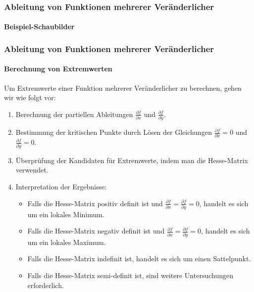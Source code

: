 \documentclass{beamer}
\begin{document}
  \begin{frame}
    \frametitle{Ableitung von Funktionen mehrerer Veränderlicher}
    \framesubtitle{Beispiel-Schaubilder}
  
    \begin{center}
    \end{center}
  \end{frame}

  \begin{frame}
    \frametitle{Ableitung von Funktionen mehrerer Veränderlicher}
    \framesubtitle{Berechnung von Extremwerten}
  
    Um Extremwerte einer Funktion mehrerer Veränderlicher zu berechnen, gehen wir wie folgt vor:
   
    \begin{enumerate}
      \item Berechnung der partiellen Ableitungen $\frac{\partial f}{\partial x}$ und $\frac{\partial f}{\partial y}$.
      \item Bestimmung der kritischen Punkte durch Lösen der Gleichungen $\frac{\partial f}{\partial x} = 0$ und $\frac{\partial f}{\partial y} = 0$.
      \item Überprüfung der Kandidaten für Extremwerte, indem man die Hesse-Matrix verwendet.
      \item Interpretation der Ergebnisse:
        \begin{itemize}
          \item Falls die Hesse-Matrix positiv definit ist und $\frac{\partial f}{\partial x} = \frac{\partial f}{\partial y} = 0$, handelt es sich um ein lokales Minimum.
          \item Falls die Hesse-Matrix negativ definit ist und $\frac{\partial f}{\partial x} = \frac{\partial f}{\partial y} = 0$, handelt es sich um ein lokales Maximum.
          \item Falls die Hesse-Matrix indefinit ist, handelt es sich um einen Sattelpunkt.
          \item Falls die Hesse-Matrix semi-definit ist, sind weitere Untersuchungen erforderlich.
        \end{itemize}
    \end{enumerate}
  \end{frame}
  
\end{document}
